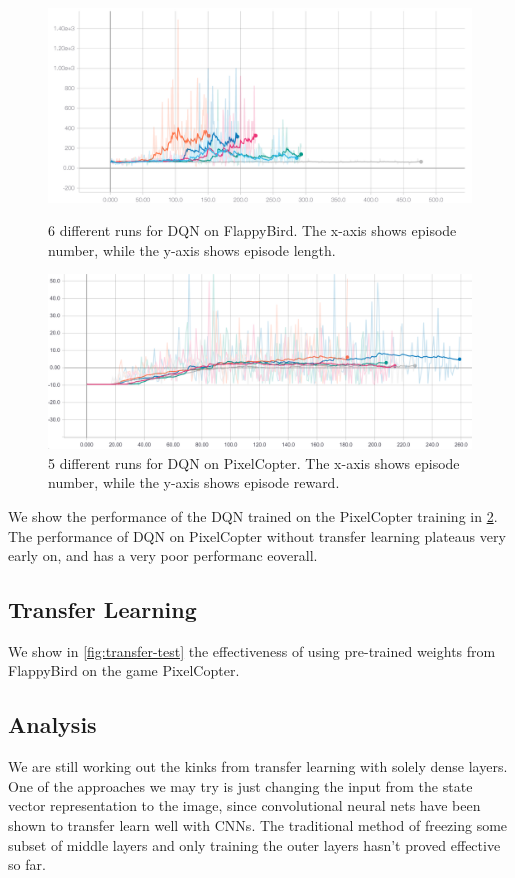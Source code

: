 \documentclass{article}
\begin{document}
\begin{figure}[h!]
\includegraphics[width=\textwidth]{flappy-training-eps}
\label{fig:flappy-training-eps}
\caption{6 different runs for DQN on FlappyBird. The x-axis shows episode number, while the y-axis shows episode length.}
\end{figure}

\begin{figure}[h!]
\includegraphics[width=\textwidth]{pixelcopter-training}
\caption{5 different runs for DQN on PixelCopter. The x-axis shows episode number, while the y-axis shows episode reward.}
\label{fig:other-training}
\end{figure}
We show the performance of the DQN trained on the PixelCopter training in \ref{fig:other-training}.
The performance of DQN on PixelCopter without transfer learning plateaus very early on, and has a very poor performanc eoverall.

\subsection{Transfer Learning}
We show in \ref{fig:transfer-test} the effectiveness of using pre-trained weights from FlappyBird on the game PixelCopter.



\subsection{Analysis}
We are still working out the kinks from transfer learning with solely dense layers. 
One of the approaches we may try is just changing the input from the state vector representation to the image, since convolutional neural nets have been shown to transfer learn well with CNNs.
The traditional method of freezing some subset of middle layers and only training the outer layers hasn't proved effective so far.
\end{document}
